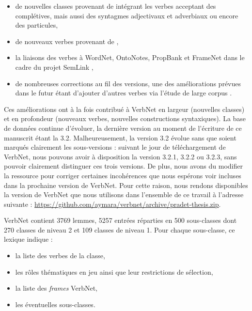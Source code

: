 \begin{itemize}

    \item de nouvelles classes provenant de \cite{korhonen2004extended}
        intégrant les verbes acceptant des complétives, mais aussi des
        syntagmes adjectivaux et adverbiaux ou encore des particules,

    \item de nouveaux verbes provenant de \cite{dorr2001lcs},

    \item la liaisons des verbes à WordNet, OntoNotes, PropBank et FrameNet
        dans le cadre du projet SemLink \citep{palmer2009semlink},

    \item de nombreuses corrections au fil des versions, une des améliorations
        prévues dans le futur étant d'ajouter d'autres verbes via l'étude de
        large corpus \citep{bonial2013expanding}.

\end{itemize}

Ces améliorations ont à la fois contribué à VerbNet en largeur (nouvelles
classes) et en profondeur (nouveaux verbes, nouvelles constructions
syntaxiques). La base de données continue d'évoluer, la dernière version au
moment de l'écriture de ce manuscrit étant la 3.2. Malheureusement, la version
3.2 évolue sans que soient marqués clairement les sous-versions : suivant le
jour de téléchargement de VerbNet, nous pouvons avoir à disposition la version
3.2.1, 3.2.2 ou 3.2.3, sans pouvoir clairement distinguer ces trois versions.
De plus, nous avons du modifier la ressource pour corriger certaines
incohérences que nous espérons voir incluses dans la prochaine version de
VerbNet. Pour cette raison, nous rendons disponibles la version de VerbNet que
nous utilisons dans l'ensemble de ce travail à l'adresse suivante :
\url{https://github.com/aymara/verbnet/archive/pradet-thesis.zip}.

VerbNet contient 3769 lemmes, 5257 entrées réparties en 500 sous-classes dont
270 classes de niveau 2 et 109 classes de niveau 1. Pour chaque sous-classe, ce
lexique indique :

\begin{itemize}
        \item la liste des verbes de la classe,
        \item les rôles thématiques en jeu ainsi que leur restrictions de sélection,
        \item la liste des \emph{frames} VerbNet,
        \item les éventuelles sous-classes.
\end{itemize}

